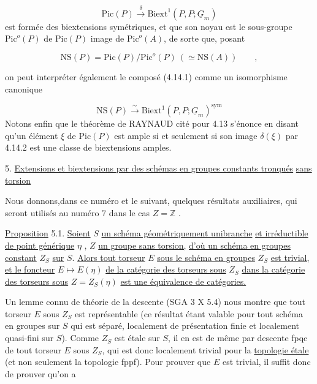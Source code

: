 \begin{equation}\tag{4.14.2}
\mathrm{Pic}(P) \xrightarrow{\ \delta\ } \mathrm{Biext}^{1}(P,P;\underline{G}_{m})
\end{equation}
est formée des biextensions symétriques, et que son noyau est le sous-groupe $\mathrm{Pic}^{o}(P)$ de $\mathrm{Pic}(P)$ image de $\mathrm{Pic}^{o}(A)$, de sorte que, posant

\begin{equation*}
\mathrm{NS}(P) = \mathrm{Pic}(P)/\mathrm{Pic}^{o}(P) \ ( \simeq \mathrm{NS}(A)) \qquad , 
\end{equation*}


 on peut interpréter également le composé (4.14.1) comme un isomorphisme canonique

\begin{equation}\tag{4.14.3}
\mathrm{NS}(P) \stackrel{\sim}{\longrightarrow} \mathrm{Biext}^1(P,P;\underline{G}_m)^{\mathrm{sym}}
\end{equation}
Notons enfin que le théorème de RAYNAUD cité pour 4.13 s'énonce en disant qu'un élément $\xi$ de $\mathrm{Pic}(P)$ est ample si et seulement si son image $\delta(\xi)$ par 4.14.2 est une classe de biextensions amples.


5. \underline{Extensions et biextensions par des schémas en groupes constants tronqués} \underline{sans torsion}

Nous donnons,dans ce numéro et le suivant, quelques résultats auxiliaires, qui seront utilisés au numéro 7 dans le cas $Z = \mathbb{Z}$ .

\underline{Proposition} 5.1. \underline{Soient} $S$ \underline{un schéma géométriquement unibranche} \underline{et irréductible de point générique} $\eta$ , $Z$ \underline{un groupe sans torsion,} \underline{d'où un schéma en groupes constant} $Z_S$ \underline{sur} $S$. \underline{Alors tout torseur} $E$ \underline{sous le schéma en groupes} $Z_S$ \underline{est trivial,} \underline{et le foncteur} $E \longmapsto E(\eta)$ \underline{de la catégorie des torseurs sous} $Z_S$ \underline{dans la catégorie des torseurs sous} $Z = Z_S(\eta)$ \underline{est une équivalence de catégories.}

Un lemme connu de théorie de la descente (SGA 3 X 5.4) nous montre que tout torseur $E$ sous $Z_S$ est représentable (ce résultat étant valable pour tout schéma en groupes sur $S$ qui est séparé, localement de présentation finie et localement quasi-fini sur $S$). Comme $Z_S$ est étale sur $S$, il en est de même par descente fpqc de tout torseur $E$ sous $Z_S$, qui est donc localement trivial pour la \underline{topologie étale} (et non seulement
la topologie fppf). Pour prouver que $E$ est trivial, il suffit donc de prouver qu'on a


